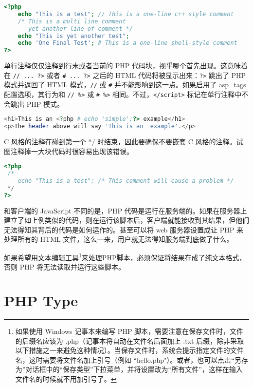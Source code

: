 \begin{lstlisting}[language=PHP]
<?php
    echo "This is a test"; // This is a one-line c++ style comment
    /* This is a multi line comment
       yet another line of comment */
    echo "This is yet another test";
    echo 'One Final Test'; # This is a one-line shell-style comment
?>
\end{lstlisting}

单行注释仅仅注释到行末或者当前的 PHP 代码块，视乎哪个首先出现。这意味着在 \texttt{// ... ?>} 或者 \texttt{\# ... ?>} 之后的 HTML 代码将被显示出来：\texttt{?>} 跳出了 PHP 模式并返回了 HTML 模式，\texttt{//} 或 \texttt{\#} 并不能影响到这一点。如果启用了 asp\_tags 配置选项，其行为和 \texttt{// \%>} 或 \texttt{\# \%>} 相同。不过，\texttt{</script>} 标记在单行注释中不会跳出 PHP 模式。

\begin{lstlisting}[language=PHP]
<h1>This is an <?php # echo 'simple';?> example</h1>
<p>The header above will say 'This is an  example'.</p>
\end{lstlisting}

C 风格的注释在碰到第一个 */ 时结束，因此要确保不要嵌套 C 风格的注释。试图注释掉一大块代码时很容易出现该错误。

\begin{lstlisting}[language=PHP]
<?php
 /*
    echo "This is a test"; /* This comment will cause a problem */
 */
?>
\end{lstlisting}

和客户端的 JavaScript 不同的是，PHP 代码是运行在服务端的。如果在服务器上建立了如上例类似的代码，则在运行该脚本后，客户端就能接收到其结果，但他们无法得知其背后的代码是如何运作的。甚至可以将 web 服务器设置成让 PHP 来处理所有的 HTML 文件，这么一来，用户就无法得知服务端到底做了什么。

如果希望用文本编辑工具\footnote{如果使用 Windows 记事本来编写 PHP 脚本，需要注意在保存文件时，文件的后缀名应该为 .php（记事本将自动在文件名后面加上 .txt 后缀，除非采取以下措施之一来避免这种情况）。当保存文件时，系统会提示指定文件的文件名，这时需要将文件名加上引号（例如 ``hello.php"）。或者，也可以点击“另存为”对话框中的“保存类型”下拉菜单，并将设置改为“所有文件”，这样在输入文件名的时候就不用加引号了。}来处理PHP脚本，必须保证将结果存成了纯文本格式，否则 PHP 将无法读取并运行这些脚本。


\chapter{PHP Type}


